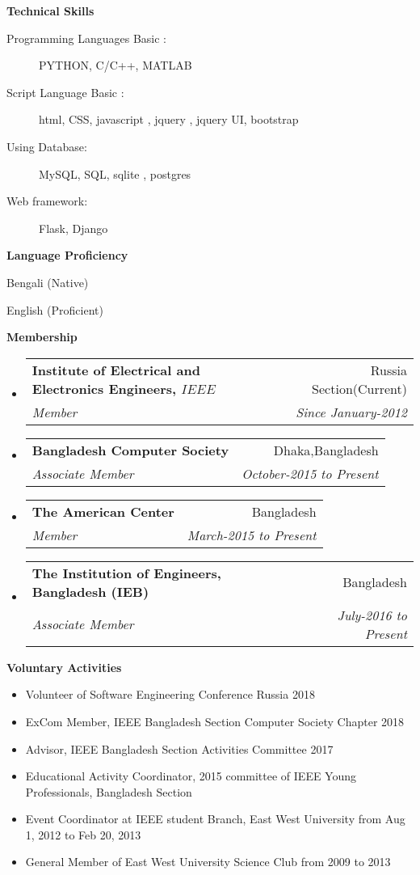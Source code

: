 \documentclass[letterpaper,10pt]{article}
\makeatletter
\newcommand{\resitem}[1]{\item #1 \vspace{-2pt}}
\newcommand{\resheading}[1]{{\large \colorbox{mygrey}{\begin{minipage}{\textwidth}{\textbf{#1 \vphantom{p\^{E}}}}\end{minipage}}}}
\newcommand{\ressubheading}[4]{
\begin{tabular*}{6.5in}{l@{\extracolsep{\fill}}r}
		\textbf{#1} & #2 \\
		\textit{#3} & \textit{#4} \\
\end{tabular*}\vspace{-6pt}}
\makeatother
\begin{document}
\begin{description}
\item
\resitem{\textbf{Technical Skills}}
\begin{description}
\item[Programming Languages Basic :] PYTHON, C/C++, MATLAB
\item[Script Language Basic :] html, CSS, javascript , jquery , jquery UI, bootstrap
\item[Using Database:] MySQL, SQL, sqlite , postgres 
\item[Web framework:] Flask, Django

\end{description}
\item
\resitem{\textbf{Language Proficiency}}
\begin{description}
\item{Bengali (Native)}
\item{English (Proficient)}
\end{description}
\end{description}

 \resheading{Membership}
 \begin{itemize}
 \item
 \ressubheading{Institute of Electrical and Electronics Engineers, \(IEEE\)}{Russia Section(Current)}{Member}{Since January-2012}


 \item
 \ressubheading{Bangladesh Computer Society}{Dhaka,Bangladesh }{Associate Member}{October-2015 to Present}
 \item
 \ressubheading{The American Center}{Bangladesh}{Member}{March-2015 to Present }
 \item
 \ressubheading{ The Institution of Engineers, Bangladesh (IEB)}{Bangladesh}{Associate Member}{July-2016 to Present }

 \end{itemize}

\resheading{Voluntary Activities}
\begin{itemize}
	\item{Volunteer of Software Engineering Conference Russia 2018 }
	\item{ExCom Member, IEEE Bangladesh Section Computer Society Chapter 2018 }
	\item {Advisor, IEEE Bangladesh Section Activities Committee 2017}
\item {Educational Activity Coordinator, 2015 committee of IEEE Young Professionals, Bangladesh Section}
    \item{Event Coordinator at IEEE student Branch, East West University from Aug 1, 2012 to Feb 20, 2013 }
    \item {General Member of East West University Science Club from 2009 to 2013}
\end{itemize}
\end{document}
